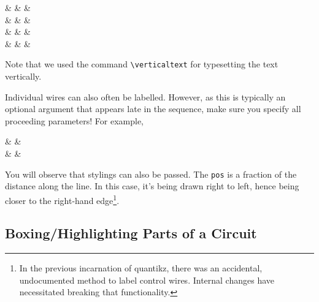 \documentclass[aps,pra,10pt,nofootinbib]{revtex4-2}
\begin{document}
\begin{Code}
\begin{quantikz}
 &  & & \\
 &  &   & \\
 &  &  &  \\
 &  &  & 
\end{quantikz}
\end{Code}
Note that we used the command \verb!\verticaltext! for typesetting the text vertically. 


Individual wires can also often be labelled. However, as this is typically an optional argument that appears late in the sequence, make sure you specify all proceeding parameters! For example,
\begin{Code}
\begin{quantikz}
&  &  \\
& \targ{} &
\end{quantikz}
\end{Code}
You will observe that stylings can also be passed. The \texttt{pos} is a fraction of the distance along the line. In this case, it's being drawn right to left, hence being closer to the right-hand edge\footnote{In the previous incarnation of quantikz, there was an accidental, undocumented method to label control wires. Internal changes have necessitated breaking that functionality.}.

\subsection{Boxing/Highlighting Parts of a Circuit}\label{sec:boxing}
\end{document}
